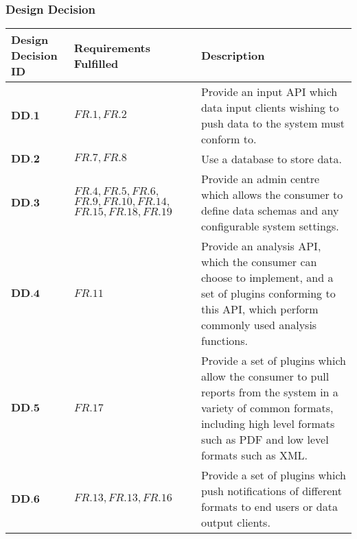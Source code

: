 \subsubsection{Design Decision}
\vspace{-0.5cm}
\begin{longtable}[H]{ | p{2cm} | p{3.5cm} | p{11cm} | }
		\hline
			\cellcolor{titleColor}\textbf{Design Decision ID}&	\cellcolor{titleColor}\textbf{Requirements Fulfilled}&	\cellcolor{titleColor}\textbf{Description}	\\ \hline
			$\textbf{DD.1}$&	$FR.1,FR.2$&	Provide an input API which data input clients wishing to push data to the system must conform to.	\\ \hline
			$\textbf{DD.2}$&	$FR.7,FR.8$ &	Use a database to store data.	\\ \hline
			$\textbf{DD.3}$ &	$FR.4,FR.5,FR.6, $
			$FR.9,FR.10,FR.14, $
			$FR.15,FR.18,FR.19$ &	Provide an admin centre which allows the consumer to define data schemas and any configurable system settings.	\\ \hline
			$\textbf{DD.4}$&	$FR.11$&	Provide an analysis API, which the consumer can choose to implement, and a set of plugins conforming to this API, which perform commonly used analysis functions.	\\ \hline
			$\textbf{DD.5}$&	$FR.17$ &	Provide a set of plugins which allow the consumer to pull reports from the system in a variety of common formats, including high level formats such as PDF and low level formats such as XML.	\\ \hline
			$\textbf{DD.6}$&	$FR.13, FR.13, FR.16$ &	Provide a set of plugins which push notifications of different formats to end users or data output clients.	\\ \hline
\end{longtable}
